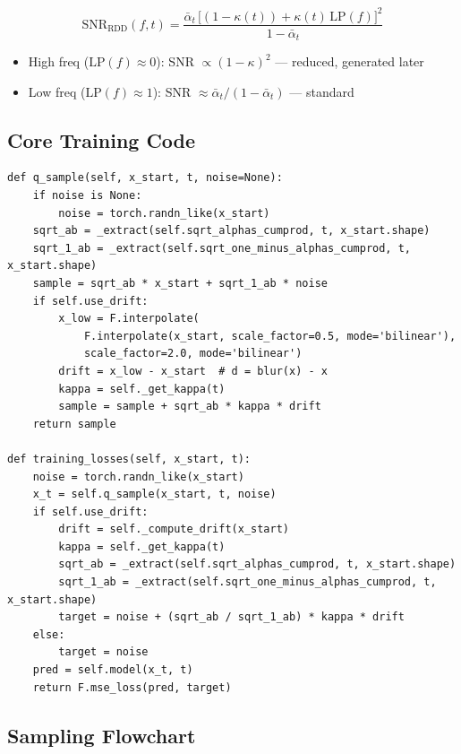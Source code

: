 \documentclass[11pt, a4paper]{article}
\newcommand{\alphabar}{\bar{\alpha}}
\begin{document}
\begin{equation}
    \boxed{\mathrm{SNR}_{\mathrm{RDD}}(f,t) = \frac{\alphabar_t\,\bigl[(1-\kappa(t)) + \kappa(t)\,\mathrm{LP}(f)\bigr]^2}{1-\alphabar_t}}
\end{equation}

\begin{itemize}
    \item High freq ($\mathrm{LP}(f)\approx 0$): SNR $\propto (1-\kappa)^2$ --- reduced, generated later
    \item Low freq ($\mathrm{LP}(f)\approx 1$): SNR $\approx \alphabar_t/(1-\alphabar_t)$ --- standard
\end{itemize}

\subsection{Core Training Code}

\begin{lstlisting}[caption={RDD q\_sample with drift}]
def q_sample(self, x_start, t, noise=None):
    if noise is None:
        noise = torch.randn_like(x_start)
    sqrt_ab = _extract(self.sqrt_alphas_cumprod, t, x_start.shape)
    sqrt_1_ab = _extract(self.sqrt_one_minus_alphas_cumprod, t, x_start.shape)
    sample = sqrt_ab * x_start + sqrt_1_ab * noise
    if self.use_drift:
        x_low = F.interpolate(
            F.interpolate(x_start, scale_factor=0.5, mode='bilinear'),
            scale_factor=2.0, mode='bilinear')
        drift = x_low - x_start  # d = blur(x) - x
        kappa = self._get_kappa(t)
        sample = sample + sqrt_ab * kappa * drift
    return sample

def training_losses(self, x_start, t):
    noise = torch.randn_like(x_start)
    x_t = self.q_sample(x_start, t, noise)
    if self.use_drift:
        drift = self._compute_drift(x_start)
        kappa = self._get_kappa(t)
        sqrt_ab = _extract(self.sqrt_alphas_cumprod, t, x_start.shape)
        sqrt_1_ab = _extract(self.sqrt_one_minus_alphas_cumprod, t, x_start.shape)
        target = noise + (sqrt_ab / sqrt_1_ab) * kappa * drift
    else:
        target = noise
    pred = self.model(x_t, t)
    return F.mse_loss(pred, target)
\end{lstlisting}

\subsection{Sampling Flowchart}
\end{document}

